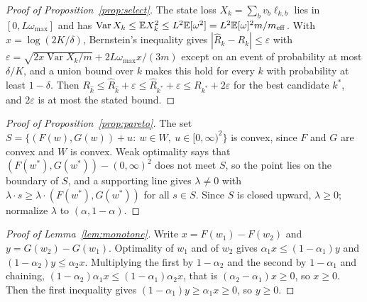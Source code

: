 \documentclass[11pt]{article}
\theoremstyle{remark}
\newcommand{\E}{\mathbb{E}}
\newcommand{\1}{\mathbf{1}}
\begin{document}
\begin{proof}[Proof of Proposition~\ref{prop:select}]
The state loss $X_k=\sum_bv_b\ell_{k,b}$ lies in $[0,L\omega_{\max}]$ and has
$\operatorname{Var}X_k\le\E X_k^2\le L^2\E[\omega^2]=L^2\E[\omega]^2m/m_{\rm eff}$. With $x=\log(2K/\delta)$, Bernstein's
inequality gives $|\hat R_k-R_k|\le\varepsilon$ with $\varepsilon=\sqrt{2x\operatorname{Var}X_k/m}+2L\omega_{\max}x/(3m)$
except on an event of probability at most $\delta/K$, and a union bound over $k$ makes this hold for every $k$ with
probability at least $1-\delta$. Then $R_{\hat k}\le\hat R_{\hat k}+\varepsilon\le\hat R_{k^\ast}+\varepsilon\le
R_{k^\ast}+2\varepsilon$ for the best candidate $k^\ast$, and $2\varepsilon$ is at most the stated bound.
\end{proof}

\begin{proof}[Proof of Proposition~\ref{prop:pareto}]
The set $S=\{(F(w),G(w))+u:\ w\in W,\ u\in[0,\infty)^2\}$ is convex, since $F$ and $G$ are convex and $W$ is convex.
Weak optimality says that $(F(w^\ast),G(w^\ast))-(0,\infty)^2$ does not meet $S$, so the point lies on the boundary of $S$,
and a supporting line gives $\lambda\neq0$ with $\lambda\cdot s\ge\lambda\cdot(F(w^\ast),G(w^\ast))$ for all $s\in S$.
Since $S$ is closed upward, $\lambda\ge0$; normalize $\lambda$ to $(\alpha,1-\alpha)$.
\end{proof}

\begin{proof}[Proof of Lemma~\ref{lem:monotone}]
Write $x=F(w_1)-F(w_2)$ and $y=G(w_2)-G(w_1)$. Optimality of $w_1$ and of $w_2$ gives $\alpha_1x\le(1-\alpha_1)y$ and
$(1-\alpha_2)y\le\alpha_2x$. Multiplying the first by $1-\alpha_2$ and the second by $1-\alpha_1$ and chaining,
$(1-\alpha_2)\alpha_1x\le(1-\alpha_1)\alpha_2x$, that is $(\alpha_2-\alpha_1)x\ge0$, so $x\ge0$. Then the first
inequality gives $(1-\alpha_1)y\ge\alpha_1x\ge0$, so $y\ge0$.
\end{proof}


\end{document}
